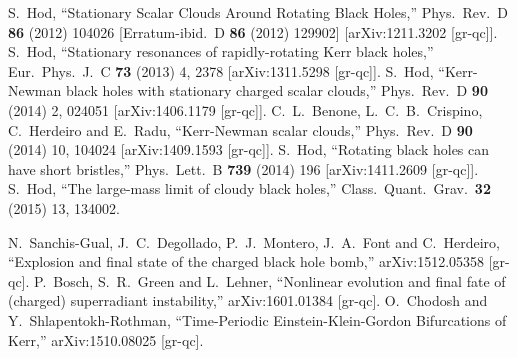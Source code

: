 \begin{small}
\begin{thebibliography}{99}
  S.~Hod,
  ``Stationary Scalar Clouds Around Rotating Black Holes,''
  Phys.\ Rev.\ D {\bf 86} (2012) 104026
   [Erratum-ibid.\ D {\bf 86} (2012) 129902]
  [arXiv:1211.3202 [gr-qc]].
  S.~Hod,
  ``Stationary resonances of rapidly-rotating Kerr black holes,''
  Eur.\ Phys.\ J.\ C {\bf 73} (2013) 4,  2378
  [arXiv:1311.5298 [gr-qc]].
  S.~Hod,
  ``Kerr-Newman black holes with stationary charged scalar clouds,''
  Phys.\ Rev.\ D {\bf 90} (2014) 2,  024051
  [arXiv:1406.1179 [gr-qc]].
  C.~L.~Benone, L.~C.~B.~Crispino, C.~Herdeiro and E.~Radu,
  ``Kerr-Newman scalar clouds,''
  Phys.\ Rev.\ D {\bf 90} (2014) 10,  104024
  [arXiv:1409.1593 [gr-qc]].
  S.~Hod,
  ``Rotating black holes can have short bristles,''
  Phys.\ Lett.\ B {\bf 739} (2014) 196
  [arXiv:1411.2609 [gr-qc]].
  S.~Hod,
  ``The large-mass limit of cloudy black holes,''
  Class.\ Quant.\ Grav.\  {\bf 32} (2015) 13,  134002.

  
  N.~Sanchis-Gual, J.~C.~Degollado, P.~J.~Montero, J.~A.~Font and C.~Herdeiro,
  ``Explosion and final state of the charged black hole bomb,''
  arXiv:1512.05358 [gr-qc].
  P.~Bosch, S.~R.~Green and L.~Lehner,
  ``Nonlinear evolution and final fate of (charged) superradiant instability,''
  arXiv:1601.01384 [gr-qc].
  O.~Chodosh and Y.~Shlapentokh-Rothman,
  ``Time-Periodic Einstein-Klein-Gordon Bifurcations of Kerr,''
  arXiv:1510.08025 [gr-qc].


\end{thebibliography}
\end{small}
